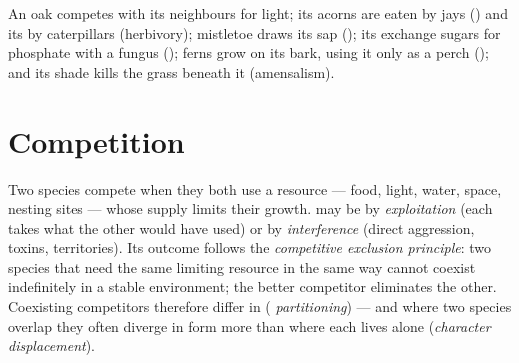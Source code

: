 \begin{example}\label{ex:b1:species-interactions:oak}
An oak competes with its neighbours for light; its acorns are eaten by
jays () and its  by caterpillars (herbivory); mistletoe
draws its sap (); its  exchange sugars for phosphate
with a fungus (); ferns grow on its bark, using it only as a
perch (); and its shade kills the grass beneath it
(amensalism).
\end{example}

\section{Competition}

\begin{definition}\label{def:b1:species-interactions:competition}
Two species compete when they both use a resource --- food, light,
water, space, nesting sites --- whose supply limits their growth.
 may be by \emph{exploitation} (each takes what the other
would have used) or by \emph{interference} (direct aggression, toxins,
territories). Its outcome follows the \emph{competitive exclusion
principle}: two species that need the same limiting resource in the
same way cannot coexist indefinitely in a stable environment; the
better competitor eliminates the other. Coexisting competitors
therefore differ in  (\emph{ partitioning}) --- and where two
species overlap they often diverge in form more than where each lives
alone (\emph{character displacement}).
\end{definition}

